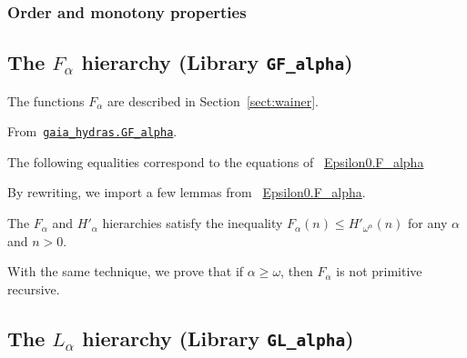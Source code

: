 
\subsubsection{Order and monotony properties}


\subsection{The \texorpdfstring{$F_\alpha$}{\texttt{F\_alpha}} hierarchy (Library \texttt{GF\_alpha})}

The functions $F_\alpha$ are described in Section~\vref{sect:wainer}. 


\vspace{4pt}

\noindent
From~\href{../theories/html/gaia_hydras.GF_alpha.html}%
{\texttt{gaia\_hydras.GF\_alpha}}.


The following equalities correspond to the equations of
~\href{../theories/html/hydras.Epsilon0.F_alpha.html}{Epsilon0.F\_alpha}



By rewriting, we import a few lemmas from
~\href{../theories/html/hydras.Epsilon0.F_alpha.html}{Epsilon0.F\_alpha}.




The $F_\alpha$ and $H'_\alpha$  hierarchies satisfy the inequality
$F_\alpha(n)\leq H'_{\omega^\alpha}(n)$ for any $\alpha$ and $n>0$.


With the same technique, we prove that if
$\alpha\geq\omega$, then $F_\alpha$ is not primitive recursive.


\subsection{The \texorpdfstring{$L_\alpha$}{\texttt{L\_alpha}} hierarchy (Library \texttt{GL\_alpha})}



